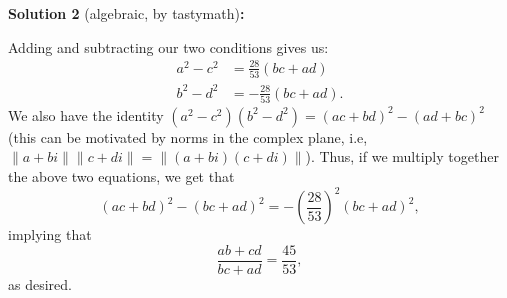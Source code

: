 \begin{solution}
\textbf{Solution 2} (algebraic, by tastymath)\textbf{:}\V

Adding and subtracting our two conditions gives us:
\begin{align*}
    a^2-c^2 &= \frac{28}{53}(bc+ad) \\
    b^2-d^2 &= -\frac{28}{53}(bc+ad).
\end{align*}
We also have the identity $(a^2-c^2)(b^2-d^2) = (ac+bd)^2-(ad+bc)^2$ (this can be motivated by norms in the complex plane, i.e, $\lVert a+bi\rVert\lVert c+di\rVert = \lVert (a+bi)(c+di)\rVert$). Thus, if we multiply together the above two equations, we get that 
\[(ac+bd)^2-(bc+ad)^2 = -\left(\frac{28}{53}\right)^2(bc+ad)^2,\]
implying that 
\[\frac{ab+cd}{bc+ad} = \frac{45}{53},\]
as desired.

\end{solution}